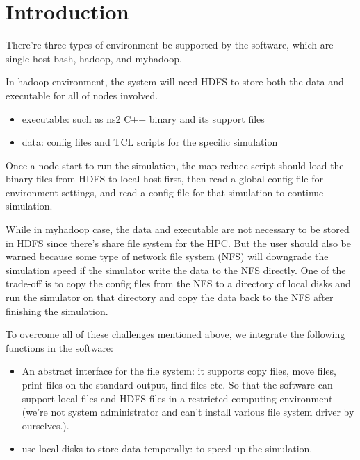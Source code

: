 %

\chapter{Introduction}

There're three types of environment be supported by the software,
which are single host bash, hadoop, and myhadoop.

In hadoop environment, the system will need HDFS to store both the data and executable for all of nodes involved.
\begin{itemize}
  \item executable: such as ns2 C++ binary and its support files
  \item data: config files and TCL scripts for the specific simulation
\end{itemize}
Once a node start to run the simulation, the map-reduce script should load the binary files from HDFS to local host first,
then read a global config file for environment settings,
and read a config file for that simulation to continue simulation.

While in myhadoop case, the data and executable are not necessary to be stored in HDFS since there's share file system for the HPC.
But the user should also be warned because some type of network file system (NFS) will downgrade the simulation speed if the simulator write the data to the NFS directly.
One of the trade-off is to copy the config files from the NFS to a directory of local disks and run the simulator on that directory and copy the data back to the NFS after finishing the simulation.

To overcome all of these challenges mentioned above,
we integrate the following functions in the software:
\begin{itemize}
  \item An abstract interface for the file system: it supports copy files, move files, print files on the standard output, find files etc. So that the software can support local files and HDFS files in a restricted computing environment (we're not system administrator and can't install various file system driver by ourselves.).
  \item use local disks to store data temporally: to speed up the simulation.
\end{itemize}




